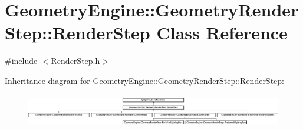 \hypertarget{class_geometry_engine_1_1_geometry_render_step_1_1_render_step}{}\section{Geometry\+Engine\+::Geometry\+Render\+Step\+::Render\+Step Class Reference}
\label{class_geometry_engine_1_1_geometry_render_step_1_1_render_step}


{\ttfamily \#include $<$Render\+Step.\+h$>$}

Inheritance diagram for Geometry\+Engine\+::Geometry\+Render\+Step\+::Render\+Step\+:\begin{figure}[H]
\begin{center}
\leavevmode
\includegraphics[height=1.493333cm]{class_geometry_engine_1_1_geometry_render_step_1_1_render_step}
\end{center}
\end{figure}
